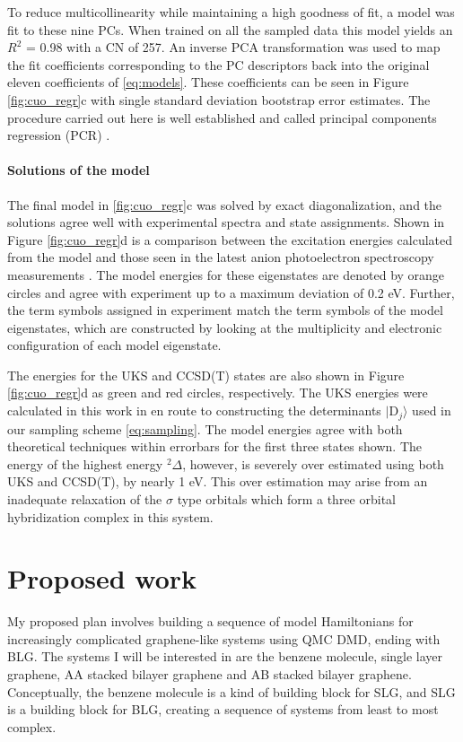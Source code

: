 \documentclass[12pt]{article}
\begin{document}
To reduce multicollinearity while maintaining a high goodness of fit, a model was fit to these nine PCs.
When trained on all the sampled data this model yields an $R^2$ = 0.98 with a CN of 257. 
An inverse PCA transformation was used to map the fit coefficients corresponding to the PC descriptors back into the original eleven coefficients of \eqref{eq:models}.
These coefficients can be seen in Figure \ref{fig:cuo_regr}c with single standard deviation bootstrap error estimates.
The procedure carried out here is well established and called principal components regression (PCR) \cite{10.2307/2348005}.

\vspace{-10pt}
\paragraph{Solutions of the model}
The final model in \ref{fig:cuo_regr}c was solved by exact diagonalization, and the solutions agree well with experimental spectra and state assignments.
Shown in Figure \ref{fig:cuo_regr}d is a comparison between the excitation energies calculated from the model and those seen in the latest anion photoelectron spectroscopy measurements \cite{Wu1997}.
The model energies for these eigenstates are denoted by orange circles and agree with experiment up to a maximum deviation of 0.2 eV.
Further, the term symbols assigned in experiment match the term symbols of the model eigenstates, which are constructed by looking at the multiplicity and electronic configuration of each model eigenstate. 

The energies for the UKS and CCSD(T) \cite{Xian2000} states are also shown in Figure \ref{fig:cuo_regr}d as green and red circles, respectively.
The UKS energies were calculated in this work in en route to constructing the determinants $|\text{D}_j\rangle$ used in our sampling scheme \eqref{eq:sampling}.
The model energies agree with both theoretical techniques within errorbars for the first three states shown.
The energy of the highest energy $^2\Delta$, however, is severely over estimated using both UKS and CCSD(T), by nearly 1 eV.
This over estimation may arise from an inadequate relaxation of the $\sigma$ type orbitals which form a three orbital hybridization complex in this system.

\section{Proposed work}
My proposed plan involves building a sequence of model Hamiltonians for increasingly complicated graphene-like systems using QMC DMD, ending with BLG.
The systems I will be interested in are the benzene molecule, single layer graphene, AA stacked bilayer graphene and AB stacked bilayer graphene.
Conceptually, the benzene molecule is a kind of building block for SLG, and SLG is a building block for BLG, creating a sequence of systems from least to most complex.
\end{document}
